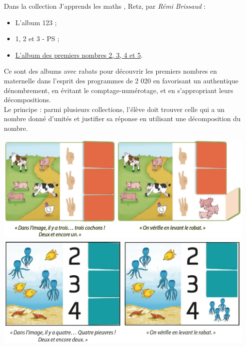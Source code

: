 \setcounter{exercice}{0}
\begin{exercice*}
   Dans la collection \og J'apprends les maths \fg, Retz, par {\it Rémi Brissaud} :
   \begin{itemize}
      \item L'album 123 ;
      \item 1, 2 et 3 - PS ;
      \item \href{https://www.youtube.com/watch?v=AvEVhRyDZa8&feature=emb_logo}{L'album des premiers nombres 2, 3, 4 et 5}. 
   \medskip
   \end{itemize}
   Ce sont des albums avec rabats pour découvrir les premiers nombres en maternelle dans l’esprit des programmes de 2 020 en favorisant un authentique dénombrement, en évitant le comptage-numérotage, et en s'appropriant leurs décompositions. \\
   Le principe : parmi plusieurs collections, l'élève doit trouver celle qui a un nombre donné d'unités et justifier sa réponse en utilisant une décomposition du nombre.
   \begin{center}
      \includegraphics[width=13cm]{Nombres_et_calculs_did/Images/Num1_activites_123_cochons} \\
      \includegraphics[width=13cm]{Nombres_et_calculs_did/Images/Num1_activites_123_pieuvres}
   \end{center}
\end{exercice*}

